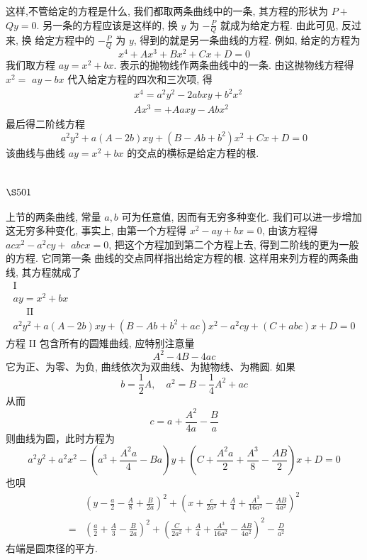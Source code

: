 这样,不管给定的方程是什么, 我们都取两条曲线中的一条, 其方程的形状为 $P+$ $Q y=0$. 另一条的方程应该是这样的, 换 $y$ 为 $-\frac{P}{Q}$ 就成为给定方程. 由此可见, 反过来, 换 给定方程中的 $-\frac{P}{Q}$ 为 $y$, 得到的就是另一条曲线的方程. 例如, 给定的方程为
\[
x^{4}+A x^{3}+B x^{2}+C x+D=0
\]
我们取方程 $a y=x^{2}+b x$. 表示的抛物线作两条曲线中的一条. 由这抛物线方程得 $x^{2}=$ $a y-b x$ 代入给定方程的四次和三次项, 得
\[
\begin{aligned}
& x^{4}=a^{2} y^{2}-2 a b x y+b^{2} x^{2} \\
& A x^{3}=+A a x y-A b x^{2}
\end{aligned}
\]
最后得二阶线方程
\[
a^{2} y^{2}+a(A-2 b) x y+\left(B-A b+b^{2}\right) x^{2}+C x+D=0
\]
该曲线与曲线 $a y=x^{2}+b x$ 的交点的横标是给定方程的根.

\section{$\S 501$}

上节的两条曲线, 常量 $a, b$ 可为任意值, 因而有无穷多种变化. 我们可以进一步增加 这无穷多种变化, 事实上, 由第一个方程得 $x^{2}-a y+b x=0$, 由该方程得 $a c x^{2}-a^{2} c y+$ $a b c x=0$, 把这个方程加到第二个方程上去, 得到二阶线的更为一般的方程. 它同第一条 曲线的交点同样指出给定方程的根. 这样用来列方程的两条曲线, 其方程就成了
\[
\begin{gathered}
\mathrm{I} \\
a y=x^{2}+b x \\
\quad \text { II } \\
a^{2} y^{2}+a(A-2 b) x y+\left(B-A b+b^{2}+a c\right) x^{2}-a^{2} c y+(C+a b c) x+D=0
\end{gathered}
\]
方程 II 包含所有的圆雉曲线, 应特别注意量
\[
A^{2}-4 B-4 a c
\]
它为正、为零、为负, 曲线依次为双曲线、为抛物线、为椭圆. 如果
\[
b=\frac{1}{2} A, \quad a^{2}=B-\frac{1}{4} A^{2}+a c
\]
从而
\[
c=a+\frac{A^{2}}{4 a}-\frac{B}{a}
\]
则曲线为圆，此时方程为
\[
a^{2} y^{2}+a^{2} x^{2}-\left(a^{3}+\frac{A^{2} a}{4}-B a\right) y+\left(C+\frac{A^{2} a}{2}+\frac{A^{3}}{8}-\frac{A B}{2}\right) x+D=0
\]
也唄
\[
\begin{aligned}
& \left(y-\frac{a}{2}-\frac{A}{8}+\frac{B}{2 a}\right)^{2}+\left(x+\frac{c}{2 a^{2}}+\frac{A}{4}+\frac{A^{3}}{16 a^{2}}-\frac{A B}{4 a^{2}}\right)^{2} \\
= & \left(\frac{a}{2}+\frac{A}{3}-\frac{B}{2 a}\right)^{2}+\left(\frac{C}{2 a^{2}}+\frac{A}{4}+\frac{A^{3}}{16 a^{2}}-\frac{A B}{4 a^{2}}\right)^{2}-\frac{D}{a^{2}}
\end{aligned}
\]
右端是圆朿径的平方.

